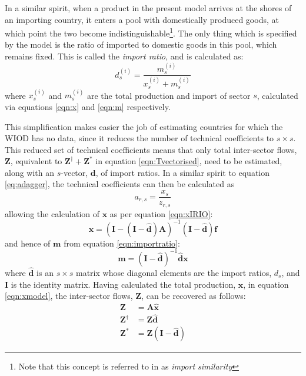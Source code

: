 \documentclass[a4paper]{article}
\begin{document}
In a similar spirit, when a product in the present model arrives at the shores of an importing country, it enters a pool with domestically produced goods, at which point the two become indistinguishable\footnote{Note that this concept is referred to in \textcite{Miller1985} as \textit{import similarity}}.
The only thing which is specified by the model is the ratio of imported to domestic goods in this pool, which remains fixed. This is called the \textit{import ratio}, and is calculated as:
\begin{equation}\label{eqn:importratio}
d_s^{(i)} = \frac{m_s^{(i)}}{x_s^{(i)} + m_s^{(i)}}
\end{equation}
where $x_s^{(i)}$ and $m_s^{(i)}$ are the total production and import of sector $s$, calculated via equations \eqref{eqn:x} and \eqref{eqn:m} respectively.

This simplification makes easier the job of estimating countries for which the WIOD has no data, since it reduces the number of technical coefficients to $s \times s$.
This reduced set of technical coefficients means that only total inter-sector flows, $\boldsymbol{Z}$, equivalent to $\boldsymbol{Z}^{\dagger} + \boldsymbol{Z}^{*}$ in equation \eqref{eqn:Tvectorised}, need to be estimated, along with an $s$-vector, $\boldsymbol{d}$, of import ratios. 
In a similar spirit to equation \eqref{eq:adagger}, the technical coefficients can then be calculated as
\begin{equation}
a_{r,s} = \frac{x_s}{z_{r,s}}
\end{equation}
allowing the calculation of $\boldsymbol{x}$ as per equation \eqref{eqn:xIRIO}:
\begin{equation}
\boldsymbol{x} = 
(\boldsymbol{I} - 
(\boldsymbol{I} - \boldsymbol{\hat{d}})
\boldsymbol{A})^{-1} 
(\boldsymbol{I} - \boldsymbol{\hat{d}})\boldsymbol{f}\label{eqn:xmodel}
\end{equation}
and hence of $\boldsymbol{m}$ from equation \eqref{eqn:importratio}:
\begin{equation}
\boldsymbol{m} = 
(\boldsymbol{I} - 
\boldsymbol{\hat{d}})^{-1} 
\boldsymbol{\hat{d}}\boldsymbol{x}\label{eqn:mmodel}
\end{equation}
where $\boldsymbol{\hat{d}}$ is an $s \times s$ matrix whose diagonal elements are the import ratios, $d_s$, and $\boldsymbol{I}$ is the identity matrix.
Having calculated the total production, $\boldsymbol{x}$, in equation \eqref{eqn:xmodel}, the inter-sector flows, $\boldsymbol{Z}$, can be recovered as follows:
\begin{align}
\boldsymbol{Z}& = \boldsymbol{A}\boldsymbol{\hat{x}}\nonumber\\
\boldsymbol{Z^\dagger}& = \boldsymbol{Z}\boldsymbol{\hat{d}}\\
\boldsymbol{Z^*}& = \boldsymbol{Z}
(\boldsymbol{I} - \boldsymbol{\hat{d}})
\end{align}
\end{document}
